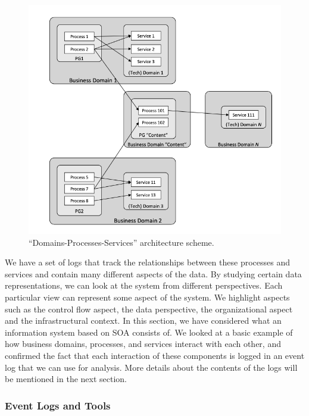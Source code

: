 \documentclass[12pt, times]{article}
\begin{document}
	\begin{figure}[h]
		\centering
		\includegraphics[scale=1]{DPS}
		\caption{“Domains-Processes-Services” architecture scheme.}
		\label{fig:dps}
	\end{figure}
	
	\hspace*{5mm}We have a set of logs that track the relationships between these processes and services and contain many different aspects of the data. By studying certain data representations, we can look at the system from different perspectives. Each particular view can represent some aspect of the system. We highlight aspects such as the control flow aspect, the data perspective, the organizational aspect and the infrastructural context.\newline
	\hspace*{5mm}In this section, we have considered what an information system based on SOA consists of. We looked at a basic example of how business domains, processes, and services interact with each other, and confirmed the fact that each interaction of these components is logged in an event log that we can use for analysis. More details about the contents of the logs will be mentioned in the next section.
	
	
	\subsubsection{Event Logs and Tools}
	
\end{document}

